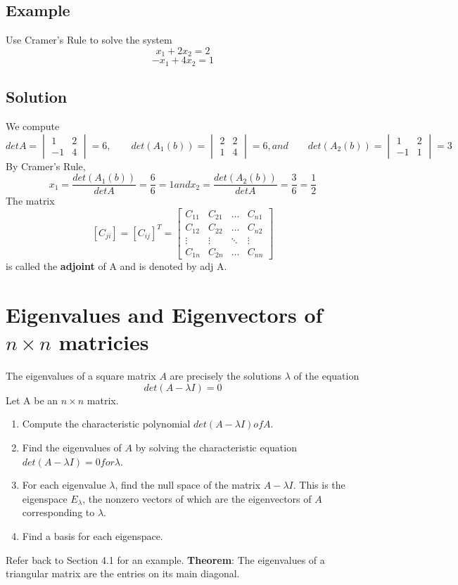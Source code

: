 \subsection*{Example}
Use Cramer's Rule to solve the system
$$x_1 + 2x_2 = 2$$ $$-x_1+4x_2 = 1$$
\subsection*{Solution}
We compute 
$$det A = \begin{vmatrix}
    1&2\\-1&4
\end{vmatrix} = 6,\qquad det(A_1(b)) = \begin{vmatrix}
    2&2\\1&4
\end{vmatrix} = 6, and \qquad det(A_2(b)) = \begin{vmatrix}
    1&2\\-1&1
\end{vmatrix} = 3$$ By Cramer's Rule,
$$x_1 = \frac{det(A_1(b))}{det A} = \frac{6}{6} = 1 and x_2 = \frac{det(A_2(b))}{det A} = \frac{3}{6} = \frac{1}{2}$$
The matrix $$[C_{ji}] = [C_{ij}]^T = \begin{bmatrix}
    C_{11}&C_{21}&\dots&C_{n1}\\
    C_{12}&C_{22}&\dots&C_{n2}\\
    \vdots&\vdots&\ddots&\vdots\\
    C_{1n}&C_{2n}&\dots&C_{nn}
\end{bmatrix}$$ is called the \textbf{adjoint} of A and is denoted by adj A. 

\section{Eigenvalues and Eigenvectors of $n\times n$ matricies}
The eigenvalues of a square matrix $A$ are precisely the solutions $\lambda$ of the equation
$$det(A-\lambda I) = 0$$
Let A be an $n\times n$ matrix.
\begin{enumerate}
    \item Compute the characteristic polynomial $det(A-\lambda I) of A$.
    \item Find the eigenvalues of $A$ by solving the characteristic equation $det(A-\lambda I) = 0 for \lambda$.
    \item For each eigenvalue $\lambda$, find the null space of the matrix $A-\lambda I$. This is the eigenspace $E_\lambda$, the nonzero vectors of which are the eigenvectors of $A$ corresponding to $\lambda$.
    \item Find a basis for each eigenspace.
\end{enumerate}
Refer back to Section 4.1 for an example.
\textbf{Theorem}: The eigenvalues of a triangular matrix are the entries on its main diagonal.

